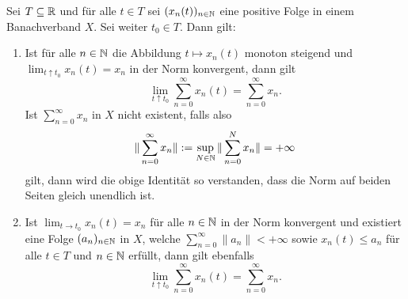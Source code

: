 





\newpage
\begin{satz}
\label{Positive Folgen in Banachverbänden}
Sei $T\subseteq \mathbb{R}$ und für alle $t\in T$ sei $(x_n(t))_{n\in\mathbb{N}}$ eine positive Folge in einem Banachverband $X$. Sei weiter $t_0\in T$. Dann gilt:
\begin{enumerate}
\item Ist für alle $n\in\mathbb{N}$ die Abbildung $t\mapsto x_n(t)$   monoton steigend und $\lim_{t\uparrow t_0}x_n(t) =  x_n$ in der Norm konvergent, dann gilt
\begin{equation*}\label{toll}
\lim_{t\uparrow t_0}\sum_{n=0}^\infty x_n(t) = \sum_{n=0}^\infty x_n.
\end{equation*}
Ist  $\sum_{n=0}^\infty x_n$ in $X$ nicht existent, falls also 
\begin{equation*}
    \|\sum_{n=0}^\infty x_n\|:=\sup_{N\in\mathbb{N}}\|\sum_{n=0}^N x_n\|=+ \infty
\end{equation*}
gilt, dann wird die obige Identität so verstanden, dass die  Norm auf beiden Seiten gleich unendlich ist.
\item Ist  $\lim_{t\to t_0} x_n(t)= x_n$ für alle $n\in\mathbb{N}$  in der Norm konvergent und existiert eine Folge $(a_n)_{n\in\mathbb{N}}$ in $X$, welche $\sum_{n=0}^\infty \|a_n \|<+\infty$ sowie $x_n(t)\leq a_n$ für alle $t\in T$ und $n\in \mathbb{N}$ erfüllt, dann gilt ebenfalls
\begin{equation*}
\lim_{t\uparrow t_0}\sum_{n=0}^\infty x_n(t) = \sum_{n=0}^\infty x_n.    
\end{equation*}
\end{enumerate}
\end{satz}

